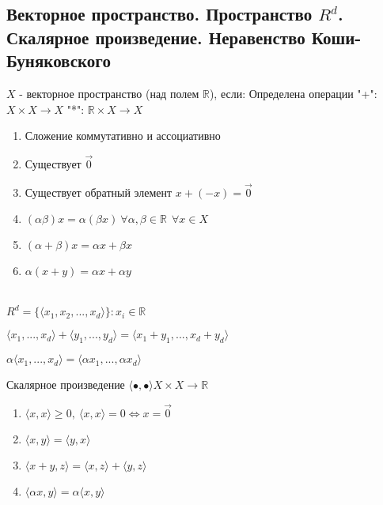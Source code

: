 \subsection{Векторное пространство. Пространство $R^d$. Скалярное произведение. Неравенство Коши-Буняковского}
    
\begin{conj}
    $X$ - векторное пространство (над полем $\mathbb{R}$), если:
    Определена операции "+": $X\times X \to X$
    "*": $\mathbb{R}\times X \to X$ \\
    \begin{enumerate}
        \item Сложение коммутативно и ассоциативно
        \item Существует $\overrightarrow{0}$
        \item Существует обратный элемент $x+(-x)=\overrightarrow{0}$
        \item $(\alpha \beta)x = \alpha(\beta x)\ \forall \alpha, \beta \in \mathbb{R}\ \ \forall x\in X$
        \item $(\alpha+\beta)x = \alpha x + \beta x$
        \item $\alpha(x+y) = \alpha x + \alpha y$
    \end{enumerate}
\end{conj}
\vspace*{0,5cm}

\begin{conj}
    \quad \\
    $R^d = \{ \langle x_1, x_2,...,x_d\rangle  \}: x_i \in \mathbb{R}$

    $\langle x_1,...,x_d\rangle +\langle y_1,...,y_d\rangle =\langle x_1+y_1,..., x_d + y_d\rangle $

    $\alpha \langle x_1,...,x_d\rangle  = \langle \alpha x_1,..., \alpha x_d\rangle $
\end{conj}

\begin{conj}
    Скалярное произведение $\langle \bullet, \bullet\rangle X\times X \to \mathbb{R}$

    \begin{enumerate}
        \item $\langle x, x\rangle \geqslant 0,\ \langle x, x\rangle =0 \Longleftrightarrow x=\overrightarrow{0}$
        \item $\langle x, y\rangle = \langle y, x\rangle$
        \item $\langle x+y, z\rangle = \langle x, z\rangle + \langle y, z \rangle $
        \item $\langle \alpha x, y\rangle = \alpha \langle x, y \rangle $
    \end{enumerate}
\end{conj}

